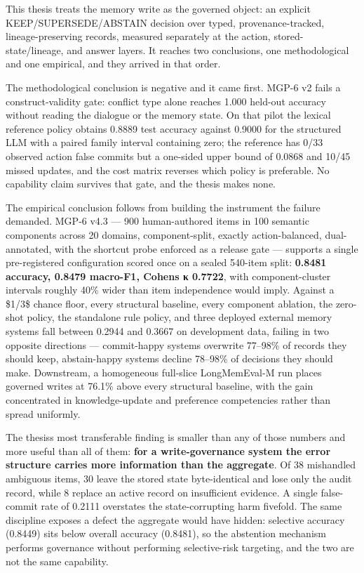 This thesis treats the memory write as the governed object: an explicit
KEEP/SUPERSEDE/ABSTAIN decision over typed, provenance-tracked,
lineage-preserving records, measured separately at the action,
stored-state/lineage, and answer layers. It reaches two conclusions, one
methodological and one empirical, and they arrived in that order.

The methodological conclusion is negative and it came first. MGP-6 v2
fails a construct-validity gate: conflict type alone reaches 1.000
held-out accuracy without reading the dialogue or the memory state. On
that pilot the lexical reference policy obtains 0.8889 test accuracy
against 0.9000 for the structured LLM with a paired family interval
containing zero; the reference has 0/33 observed action false commits
but a one-sided upper bound of 0.0868 and 10/45 missed updates, and the
cost matrix reverses which policy is preferable. No capability claim
survives that gate, and the thesis makes none.

The empirical conclusion follows from building the instrument the
failure demanded. MGP-6 v4.3 --- 900 human-authored items in 100
semantic components across 20 domains, component-split, exactly
action-balanced, dual-annotated, with the shortcut probe enforced as a
release gate --- supports a single pre-registered configuration scored
once on a sealed 540-item split: \textbf{0.8481 accuracy, 0.8479
macro-F1, Cohen\textquotesingle s κ 0.7722}, with component-cluster
intervals roughly 40\% wider than item independence would imply. Against
a \$1/3\$ chance floor, every structural baseline, every component
ablation, the zero-shot policy, the standalone rule policy, and three
deployed external memory systems fall between 0.2944 and 0.3667 on
development data, failing in two opposite directions --- commit-happy
systems overwrite 77--98\% of records they should keep, abstain-happy
systems decline 78--98\% of decisions they should make. Downstream, a
homogeneous full-slice LongMemEval-M run places governed writes at
76.1\% above every structural baseline, with the gain concentrated in
knowledge-update and preference competencies rather than spread
uniformly.

The thesis\textquotesingle s most transferable finding is smaller than
any of those numbers and more useful than all of them: \textbf{for a
write-governance system the error structure carries more information
than the aggregate}. Of 38 mishandled ambiguous items, 30 leave the
stored state byte-identical and lose only the audit record, while 8
replace an active record on insufficient evidence. A single false-commit
rate of 0.2111 overstates the state-corrupting harm fivefold. The same
discipline exposes a defect the aggregate would have hidden: selective
accuracy (0.8449) sits below overall accuracy (0.8481), so the
abstention mechanism performs governance without performing
selective-risk targeting, and the two are not the same capability.

